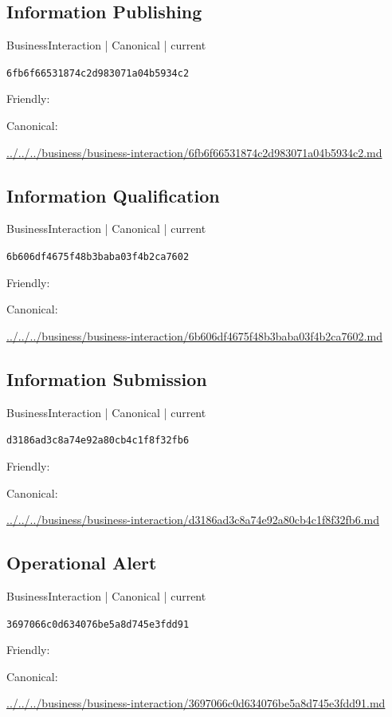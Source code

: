\documentclass[10pt,a4paper]{article}
\begin{document}
\subsection*{Information Publishing}
{\small BusinessInteraction | Canonical | current}\par
\texttt{6fb6f66531874c2d983071a04b5934c2}\par
Friendly: \par
Canonical: \par
{\footnotesize\url{../../../business/business-interaction/6fb6f66531874c2d983071a04b5934c2.md}}\par
\subsection*{Information Qualification}
{\small BusinessInteraction | Canonical | current}\par
\texttt{6b606df4675f48b3baba03f4b2ca7602}\par
Friendly: \par
Canonical: \par
{\footnotesize\url{../../../business/business-interaction/6b606df4675f48b3baba03f4b2ca7602.md}}\par
\subsection*{Information Submission}
{\small BusinessInteraction | Canonical | current}\par
\texttt{d3186ad3c8a74e92a80cb4c1f8f32fb6}\par
Friendly: \par
Canonical: \par
{\footnotesize\url{../../../business/business-interaction/d3186ad3c8a74e92a80cb4c1f8f32fb6.md}}\par
\subsection*{Operational Alert}
{\small BusinessInteraction | Canonical | current}\par
\texttt{3697066c0d634076be5a8d745e3fdd91}\par
Friendly: \par
Canonical: \par
{\footnotesize\url{../../../business/business-interaction/3697066c0d634076be5a8d745e3fdd91.md}}\par
\end{document}
